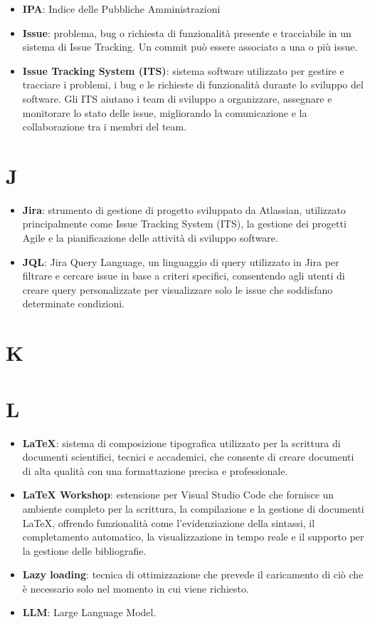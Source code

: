 \documentclass[a4paper,12pt]{article}
\begin{document}
\begin{itemize}
    \item \textbf{IPA}: Indice delle Pubbliche Amministrazioni
    \item \textbf{Issue}: problema, bug o richiesta di funzionalità presente e tracciabile in un sistema di Issue Tracking. Un commit può essere associato a una o più issue.
    \item \textbf{Issue Tracking System (ITS)}: sistema software utilizzato per gestire e tracciare i problemi, i bug e le richieste di funzionalità durante lo sviluppo del software. Gli ITS aiutano i team di sviluppo a organizzare, assegnare e monitorare lo stato delle issue, migliorando la comunicazione e la collaborazione tra i membri del team.
\end{itemize}
\section{J}
\begin{itemize}
    \item \textbf{Jira}: strumento di gestione di progetto sviluppato da Atlassian, utilizzato principalmente come Issue Tracking System (ITS), la gestione dei progetti Agile e la pianificazione delle attività di sviluppo software.
    \item \textbf{JQL}: Jira Query Language, un linguaggio di query utilizzato in Jira per filtrare e cercare issue in base a criteri specifici, consentendo agli utenti di creare query personalizzate per visualizzare solo le issue che soddisfano determinate condizioni.
\end{itemize}
\section{K}
\section{L}
\begin{itemize}
    \item \textbf{LaTeX}: sistema di composizione tipografica utilizzato per la scrittura di documenti scientifici, tecnici e accademici, che consente di creare documenti di alta qualità con una formattazione precisa e professionale.
    \item \textbf{LaTeX Workshop}: estensione per Visual Studio Code che fornisce un ambiente completo per la scrittura, la compilazione e la gestione di documenti LaTeX, offrendo funzionalità come l'evidenziazione della sintassi, il completamento automatico, la visualizzazione in tempo reale e il supporto per la gestione delle bibliografie.
    \item \textbf{Lazy loading}: tecnica di ottimizzazione che prevede il caricamento di ciò che è necessario solo nel momento in cui viene richiesto.
    \item \textbf{LLM}: Large Language Model.
\end{itemize}
\end{document}
